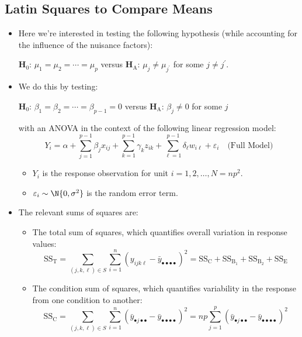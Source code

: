 \subsection{Latin Squares to Compare Means}
\begin{itemize}
    \item Here we're interested in testing the following hypothesis (while accounting for the influence of the
          nuisance factors):
          \begin{tightcenter}
              $ \mathbf{H}_0 $: $ \mu_1=\mu_2=\cdots=\mu_p $ versus $ \mathbf{H}_\text{A} $: $ \mu_j\ne \mu_{j^\prime} $ for some $ j\ne j^\prime $.
          \end{tightcenter}
    \item We do this by testing:
          \begin{tightcenter}
              $ \mathbf{H}_0 $: $ \beta_1=\beta_2=\cdots=\beta_{p-1}=0 $ versus $ \mathbf{H}_\text{A} $: $ \beta_j\ne 0$ for some $ j $
          \end{tightcenter}
          with an ANOVA in the context of the following linear regression model:
          \[ Y_i=\alpha+\sum_{j=1}^{p-1} \beta_j x_{ij}+\sum_{k=1}^{p-1} \gamma_k z_{ik}+\sum_{\ell=1}^{p-1} \delta_\ell w_{i\ell}+\varepsilon_i\quad \text{(Full Model)} \]
          \begin{itemize}
              \item $ Y_i $ is the response observation for unit $ i=1,2,\ldots,N=np^2 $.
              \item $ \varepsilon_i \sim \N{0,\sigma^2} $ is the random error term.
          \end{itemize}
    \item The relevant sums of squares are:
          \begin{itemize}
              \item The total sum of squares, which quantifies overall variation in response values:
                    \[ \text{SS}_\text{T}=\sum_{(j,k,\ell)\in S}\sum_{i=1}^{n} (y_{ijk\ell}-\bar{y}_{\bullet\bullet\bullet\bullet})^2=\text{SS}_{\text{C}}+\text{SS}_{\text{B}_1}+\text{SS}_{\text{B}_2}+\text{SS}_{\text{E}}  \]
              \item The condition sum of squares, which quantifies variability in the response from one condition to another:
                    \[ \text{SS}_{\text{C}}=\sum_{(j,k,\ell)\in S}\sum_{i=1}^{n} (\bar{y}_{\bullet j\bullet\bullet}-\bar{y}_{\bullet\bullet\bullet\bullet})^2=np \sum_{j=1}^{p} (\bar{y}_{\bullet j\bullet\bullet}-\bar{y}_{\bullet\bullet\bullet\bullet})^2  \]

\end{itemize}
\end{itemize}
